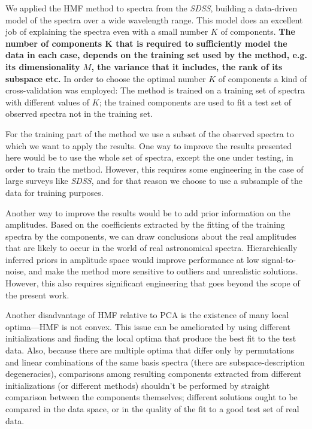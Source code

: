 \documentclass[12pt,preprint]{aastex}
\newcommand{\project}[1]{\textsl{#1}}
\newcommand{\sdss}{\project{SDSS}}
\newcommand{\SDSS}{\sdss}
\begin{document}
We applied the HMF method to spectra from the \SDSS, building a data-driven
model of the spectra over a wide wavelength range.  This model does an
excellent job of explaining the spectra even with a small number $K$
of components.  \textbf{The number of components K that is required to 
sufficiently model the data in each case, depends on the training set 
used by the method, e.g. its dimensionality $M$, the variance that it 
includes, the rank of its subspace etc.} In order to choose the optimal 
number $K$ of components a kind of cross-validation was employed: The 
method is trained on a training set of spectra with different values 
of $K$; the trained components are used to fit a test set of observed 
spectra not in the training set.

For the training part of the method we use a subset of the observed
spectra to which we want to apply the results. One way to improve the
results presented here would be to use the whole set of spectra,
except the one under testing, in order to train the method. However,
this requires some engineering in the case of large surveys like
\SDSS, and for that reason we choose to use a subsample of the data
for training purposes.

Another way to improve the results would be to add prior information
on the amplitudes. Based on the coefficients extracted by the fitting
of the training spectra by the components, we can draw conclusions
about the real amplitudes that are likely to occur in the world of
real astronomical spectra.  Hierarchically inferred priors in
amplitude space would improve performance at low signal-to-noise, and
make the method more sensitive to outliers and unrealistic solutions.
However, this also requires significant engineering that goes beyond
the scope of the present work.

Another disadvantage of HMF relative to PCA is the existence of many
local optima---HMF is not convex.  This issue can be ameliorated by
using different initializations and finding the local optima that
produce the best fit to the test data.  Also, because there are
multiple optima that differ only by permutations and linear
combinations of the same basis spectra (there are subspace-description
degeneracies), comparisons among resulting components extracted from
different initializations (or different methods) shouldn't be performed
by straight comparison between the components themselves; different
solutions ought to be compared in the data space, or in the quality of
the fit to a good test set of real data.
\end{document}
